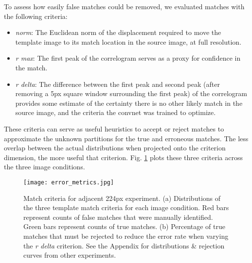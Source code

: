 \documentclass{article}
\begin{document}
To assess how easily false matches could be removed, we evaluated matches with the following criteria:
\begin{itemize}
    \item \textit{norm}: The Euclidean norm of the displacement required to move the template image to its match location in the source image, at full resolution.
    \item \textit{r max}: The first peak of the correlogram serves as a proxy for confidence in the match.
    \item \textit{r delta}: The difference between the first peak and second peak (after removing a 5px square window surrounding the first peak) of the correlogram provides some estimate of the certainty there is no other likely match in the source image, and the criteria the convnet was trained to optimize.
\end{itemize}

These criteria can serve as useful heuristics to accept or reject matches to approximate the unknown partitions for the true and erroneous matches. The less overlap between the actual distributions when projected onto the criterion dimension, the more useful that criterion. Fig. \ref{criteria_distributions} plots these three criteria across the three image conditions.

\begin{figure}[h]
  \centering
  
  \texttt{[image: error\_metrics.jpg]}
  \caption{Match criteria for adjacent 224px experiment. (a) Distributions of the three template match criteria for each image condition. Red bars represent counts of false matches that were manually identified. Green bars represent counts of true matches. (b) Percentage of true matches that must be rejected to reduce the error rate when varying the \textit{r delta} criterion. See the Appendix for distributions \& rejection curves from other experiments.}
  \label{criteria_distributions}
\end{figure}
\end{document}
